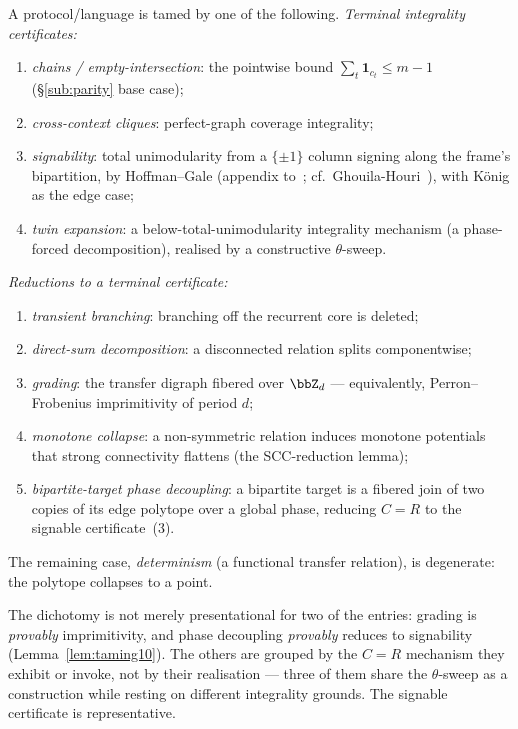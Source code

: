 \begin{definition}\label{def:tamings}
A protocol/language is tamed by one of the following. \emph{Terminal integrality
certificates:}
\begin{enumerate}[label=\textup{(\arabic*)}, itemsep=1pt]
  \item \emph{chains / empty-intersection}: the pointwise bound
    $\sum_t \mathbf 1_{c_t}\le m-1$ (\S\ref{sub:parity} base case);
  \item \emph{cross-context cliques}: perfect-graph coverage integrality;
  \item \emph{signability}: total unimodularity from a $\{\pm1\}$ column signing
    along the frame's bipartition, by Hoffman--Gale (appendix
    to~\cite{HellerTompkins1956}; cf.\ Ghouila-Houri~\cite{GhouilaHouri1962}),
    with K\"onig as the edge case;
  \item \emph{twin expansion}: a below-total-unimodularity integrality mechanism
    (a phase-forced decomposition), realised by a constructive $\theta$-sweep.
\end{enumerate}
\emph{Reductions to a terminal certificate:}
\begin{enumerate}[label=\textup{(\arabic*)}, itemsep=1pt, start=5]
  \item \emph{transient branching}: branching off the recurrent core is deleted;
  \item \emph{direct-sum decomposition}: a disconnected relation splits
    componentwise;
  \item \emph{grading}: the transfer digraph fibered over $\bbZ_d$ ---
    equivalently, Perron--Frobenius imprimitivity of period $d$;
  \item \emph{monotone collapse}: a non-symmetric relation induces monotone
    potentials that strong connectivity flattens (the SCC-reduction lemma);
  \item \emph{bipartite-target phase decoupling}: a bipartite target is a fibered
    join of two copies of its edge polytope over a global phase, reducing $C=R$ to
    the signable certificate~(3).
\end{enumerate}
The remaining case, \emph{determinism} (a functional transfer relation), is
degenerate: the polytope collapses to a point.
\end{definition}

The dichotomy is not merely presentational for two of the entries: grading is
\emph{provably} imprimitivity, and phase decoupling \emph{provably} reduces to
signability (Lemma~\ref{lem:taming10}). The others are grouped by the $C=R$
mechanism they exhibit or invoke, not by their realisation --- three of them share
the $\theta$-sweep as a construction while resting on different integrality
grounds. The signable certificate is representative.


